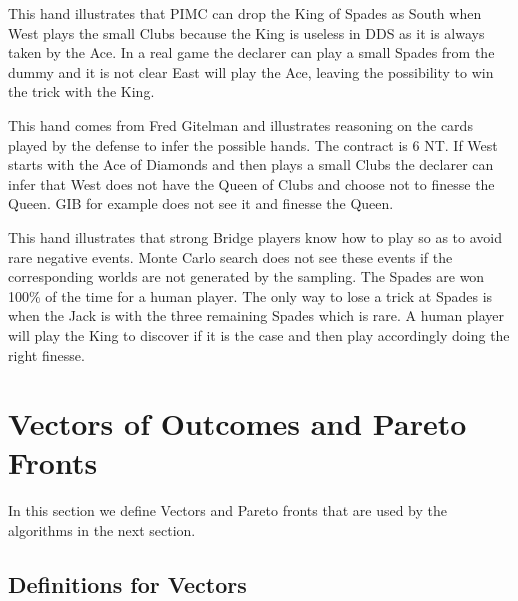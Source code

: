 \documentclass{ecai}
\begin{document}
\begin{handdiagram}
\end{handdiagram}

This hand illustrates that PIMC can drop the King of Spades as South
when West plays the small Clubs because the King is useless in DDS as
it is always taken by the Ace. In a real game the declarer can play a
small Spades from the dummy and it is not clear East will play the
Ace, leaving the possibility to win the trick with the King.

\begin{handdiagram}
\east{,,,}
\west{,,,}
\end{handdiagram}

This hand comes from Fred Gitelman and illustrates reasoning on the
cards played by the defense to infer the possible hands. The contract
is 6 NT. If West starts with the Ace of Diamonds and then plays a
small Clubs the declarer can infer that West does not have the Queen
of Clubs and choose not to finesse the Queen. GIB for example does not
see it and finesse the Queen.

\begin{handdiagram}
\east{,,,}
\west{,,,}
\end{handdiagram}

This hand illustrates that strong Bridge players know how to play so
as to avoid rare negative events. Monte Carlo search does not see
these events if the corresponding worlds are not generated by the
sampling. The Spades are won 100\% of the time for a human player. The
only way to lose a trick at Spades is when the Jack is with the three
remaining Spades which is rare. A human player will play the King to
discover if it is the case and then play accordingly doing the right
finesse.


\section{Vectors of Outcomes and Pareto Fronts}

In this section we define Vectors and Pareto fronts that are used by
the algorithms in the next section.

\subsection{Definitions for Vectors}
\end{document}
